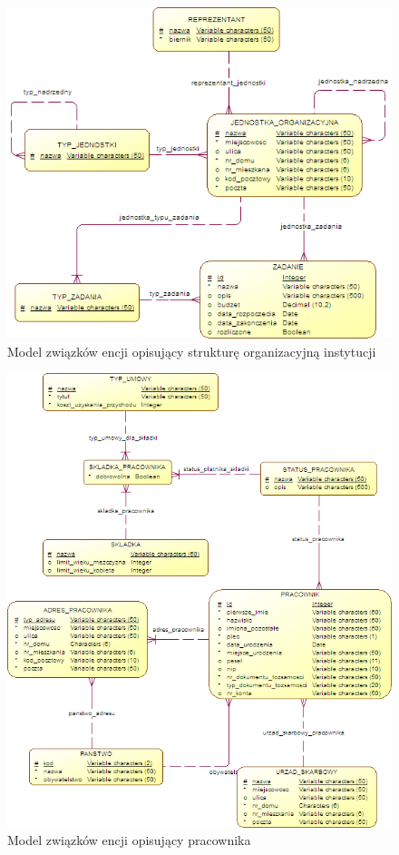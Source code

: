 \begin{figure}[tdh]
    \begin{center}
	\includegraphics[scale=1]{img/logiczny1.png}
	\caption{Model związków encji opisujący strukturę organizacyjną instytucji}
	\label{logiczny1}
    \end{center}
\end{figure}
\begin{figure}[]
    \begin{center}
	\includegraphics[scale=1]{img/logiczny2.png}
	\caption{Model związków encji opisujący pracownika}
	\label{logiczny2}
    \end{center}
\end{figure}
